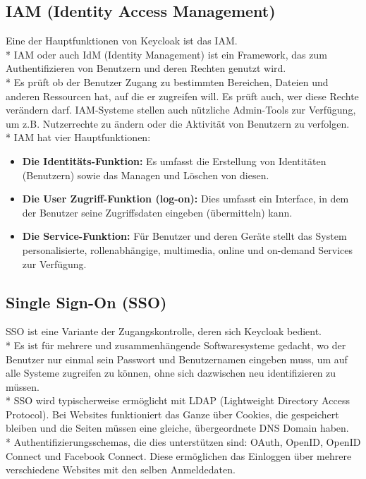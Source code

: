 \subsection{IAM (Identity Access Management)}
\label{sec:IAM}
Eine der Hauptfunktionen von Keycloak ist das IAM. \\*
IAM oder auch IdM (Identity Management) ist ein Framework, das zum Authentifizieren von Benutzern und deren Rechten genutzt wird. \\*
Es prüft ob der Benutzer Zugang zu bestimmten Bereichen, Dateien und anderen Ressourcen hat, auf die er zugreifen will. Es prüft auch, wer diese Rechte verändern darf.
IAM-Systeme stellen auch nützliche Admin-Tools zur Verfügung, um z.B. Nutzerrechte zu ändern oder die Aktivität von Benutzern zu verfolgen. \cite{KeycloakMakeIT} \\*
IAM hat vier Hauptfunktionen:
\begin{itemize}
    \item \textbf{Die Identitäts-Funktion: }Es umfasst die Erstellung von Identitäten (Benutzern) sowie das Managen und Löschen von diesen.  
    \item \textbf{Die User Zugriff-Funktion (log-on): } Dies umfasst ein Interface, in dem der Benutzer seine Zugriffsdaten eingeben (übermitteln) kann.
    \item \textbf{Die Service-Funktion: } Für Benutzer und deren Geräte stellt das System personalisierte, rollenabhängige, multimedia, online und on-demand Services zur Verfügung. \cite{KeycloakMakeIT}
\end{itemize}

\subsection{Single Sign-On (SSO)}
\label{sec:SSO}
SSO ist eine Variante der Zugangskontrolle, deren sich Keycloak bedient. \\*
Es ist für mehrere und zusammenhängende Softwaresysteme gedacht, wo der Benutzer nur einmal sein Passwort und Benutzernamen eingeben muss, um auf alle Systeme zugreifen zu können,
ohne sich dazwischen neu identifizieren zu müssen.\\* SSO wird typischerweise ermöglicht mit LDAP (Lightweight Directory Access Protocol). Bei Websites funktioniert das Ganze über Cookies, die gespeichert bleiben 
und die Seiten müssen eine gleiche, übergeordnete DNS Domain haben.\\* 
Authentifizierungsschemas, die dies unterstützen sind: OAuth, OpenID, OpenID Connect und Facebook Connect. Diese ermöglichen das Einloggen über mehrere verschiedene Websites mit den selben Anmeldedaten.\cite{KeycloakMakeIT}
